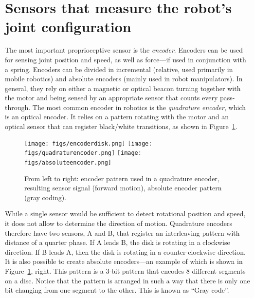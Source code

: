 
\section{Sensors that measure the robot's joint configuration}\label{sec:sensors:encoders}

The most important proprioceptive sensor is the \textsl{encoder}. Encoders can be used for sensing joint position and speed, as well as force---if used in conjunction with a spring. Encoders can be divided in incremental (relative, used primarily in mobile robotics) and absolute encoders (mainly used in robot manipulators).
In general, they rely on either a magnetic or optical beacon turning together with the motor and being sensed by an appropriate sensor that counts every pass-through. The most common encoder in robotics is the \textsl{quadrature encoder}, which is an optical encoder. It relies on a pattern rotating with the motor and an optical sensor that can register black/white transitions, as shown in Figure~\ref{fig:encoders}.

\begin{figure}
	\centering
		\texttt{[image: figs/encoderdisk.png]}
		\texttt{[image: figs/quadraturencoder.png]}
		\texttt{[image: figs/absoluteencoder.png]}
	\caption{From left to right: encoder pattern used in a quadrature encoder, resulting sensor signal (forward motion), absolute encoder pattern (gray coding).}
	\label{fig:encoders}
\end{figure}

While a single sensor would be sufficient to detect rotational position and speed, it does not allow to determine the direction of motion. Quadrature encoders therefore have two sensors, A and B, that register an interleaving pattern with distance of a quarter phase. If A leads B, the disk is rotating in a clockwise direction. If B leads A, then the disk is rotating in a counter-clockwise direction. It is also possible to create absolute encoders---an example of which is shown in Figure~\ref{fig:encoders}, right. This pattern is a 3-bit pattern that encodes 8 different segments on a disc. Notice that the pattern is arranged in such a way that there is only one bit changing from one segment to the other. This is known as ``Gray code''.

